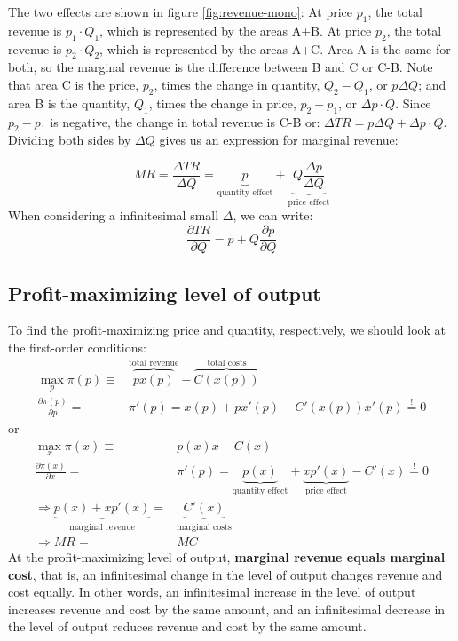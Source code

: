The two effects are shown in figure \ref{fig:revenue-mono}: At price \(p_1\), the total revenue is \(p_1 \cdot Q_1\), which is represented by the areas A+B. At price \(p_2\), the total revenue is \(p_2 \cdot Q_2\), which is represented by the areas A+C. Area A is the same for both, so the marginal revenue is the difference between B and C or C-B. Note that area C is the price, \(p_2\), times the change in quantity, \(Q_2 - Q_1\), or \(p \Delta Q\); and area B is the quantity, \(Q_1\), times the change in price, \(p_2 - p_1\), or \(\Delta p \cdot Q\). Since \(p_2 - p_1\) is negative, the change in total revenue is C-B or: \(\Delta TR = p \Delta Q + \Delta p \cdot Q\). Dividing both sides by \(\Delta Q\) gives us an expression for marginal revenue:

\[
MR = \frac{\Delta TR}{\Delta Q} = \underbrace{p}_{\text{quantity effect}} + \underbrace{Q \frac{\Delta p}{\Delta Q}}_{\text{price effect}}
\]
When considering a infinitesimal small $\Delta$, we can write:
$$
\frac{\partial TR}{\partial Q}=p+Q\frac{\partial p}{\partial Q}
$$
\subsection{Profit-maximizing level of output}\label{profit-maximizing-level-of-output}

To find the profit-maximizing price and quantity, respectively, we should look at the first-order conditions:
\begin{align*}
	\max_{p} \pi (p) \equiv &  \overbrace{px(p)}^{\text{total revenue}} -  \overbrace{C(x(p))}^{\text{total costs}}\\
	\frac{\partial \pi (p)}{\partial p} =& \pi ' (p) = x(p) + px'(p) - C'(x(p))x'(p) \overset{!}{=} 0
\end{align*}
or
\begin{align*}
	\max_{x} \pi (x) \equiv &  p(x)x - C(x)\\
	\frac{\partial \pi (x)}{\partial x} =& \pi ' (p) = \underbrace{p(x)}_{\text{quantity effect}} + \underbrace{xp'(x)}_{\text{price effect}} - C'(x) \overset{!}{=} 0\\
	\Rightarrow \underbrace{p(x) + xp'(x)}_{\text{marginal revenue}} =& \underbrace{C'(x)}_{\text{marginal costs}}\\
	\Rightarrow MR =& MC
\end{align*}
At the profit-maximizing level of output, \textbf{marginal revenue equals marginal cost}, that is, an infinitesimal change in the level of output changes revenue and cost equally. In other words, an infinitesimal increase in the level of output increases revenue and cost by the same amount, and an infinitesimal decrease in the level of output reduces revenue and cost by the same amount.

